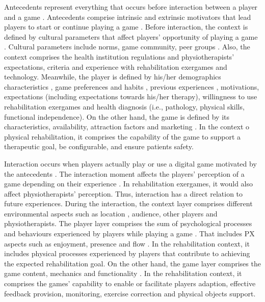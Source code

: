 Antecedents represent everything that occurs before interaction between a player and a game \autocite{Fernandez2008}. Antecedents comprise intrinsic and extrinsic motivators that lead players to start or continue playing a game \autocite{Fernandez2008}. Before interaction, the context is defined by cultural parameters that affect players' opportunity of playing a game \autocite{Elson2014,Nacked}. Cultural parameters include norms, game community, peer groups \autocite{Elson2014,Nacked}. Also, the context comprises the health institution regulations and physiotherapists' expectations, criteria and experience with rehabilitation exergames and technology. Meanwhile, the player is defined by his/her demographics characteristics \autocite{Elson2014,Fernandez2008}, game preferences and habits \autocite{Fernandez2008}, previous experiences \autocite{Nacked,Elson2014}, motivations, expectations (including expectations towards his/her therapy), willingness to use rehabilitation exergames and health diagnosis (i.e., pathology, physical skills, functional independence). On the other hand, the game is defined by its characteristics, availability, attraction factors and marketing \autocite{Elson2014,Nacked}. In the context o physical rehabilitation, it comprises the capability of the game to support a therapeutic goal, be configurable, and ensure patients safety.

Interaction occurs when players actually play or use a digital \autocite{Elson2014,Fernandez2008,Nacked} game motivated by the antecedents \autocite{Fernandez2008}. The interaction moment affects the players' perception of a game depending on their experience \autocite{Fernandez2008}. In rehabilitation exergames, it would also affect physiotherapists' perception. Thus, interaction has a direct relation to future experiences. During the interaction, the context layer comprises different environmental aspects such as location \autocite{Elson2014,Engl2013}, audience, other players \autocite{Elson2014,DeKort2007b,Mayra} and physiotherapists. The player layer comprises the sum of psychological processes and behaviours experienced by players while playing a game \autocite{Elson2014}. That includes \ac{PX} aspects such as enjoyment, presence and flow \autocite{Elson2014}. In the rehabilitation context, it includes physical processes experienced by players that contribute to achieving the expected rehabilitation goal. On the other hand, the game layer comprises the game content, mechanics and functionality \autocite{Elson2014,Engl2013,Nackea2}. In the rehabilitation context, it comprises the games' capability to enable or facilitate players adaption, effective feedback provision, monitoring, exercise correction and physical objects support.

